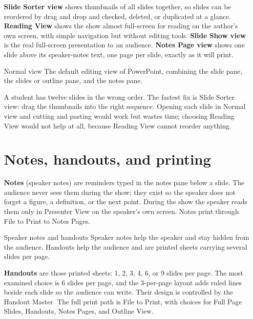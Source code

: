 \textbf{Slide Sorter view} shows thumbnails of all slides together, so slides
can be reordered by drag and drop and checked, deleted, or duplicated at a
glance. \textbf{Reading View} shows the show almost full-screen for reading on
the author's own screen, with simple navigation but without editing tools.
\textbf{Slide Show view} is the real full-screen presentation to an audience.
\textbf{Notes Page view} shows one slide above its speaker-notes text, one
page per slide, exactly as it will print.

\begin{definitionbox}{Normal view}
The default editing view of PowerPoint, combining the slide pane, the
slides or outline pane, and the notes pane.
\end{definitionbox}

\begin{example}
A student has twelve slides in the wrong order. The fastest fix is Slide
Sorter view: drag the thumbnails into the right sequence. Opening each slide
in Normal view and cutting and pasting would work but wastes time; choosing
Reading View would not help at all, because Reading View cannot reorder
anything.
\end{example}

\section{Notes, handouts, and printing}
\textbf{Notes} (speaker notes) are reminders typed in the notes pane below a
slide. The audience never sees them during the show; they exist so the speaker
does not forget a figure, a definition, or the next point. During the show the
speaker reads them only in Presenter View on the speaker's own screen. Notes
print through File to Print to Notes Pages.

\begin{definitionbox}{Speaker notes and handouts}
Speaker notes help the speaker and stay hidden from the audience. Handouts
help the audience and are printed sheets carrying several slides per page.
\end{definitionbox}

\textbf{Handouts} are those printed sheets: 1, 2, 3, 4, 6, or 9 slides per
page. The most examined choice is 6 slides per page, and the 3-per-page layout
adds ruled lines beside each slide so the audience can write. Their design is
controlled by the Handout Master. The full print path is File to Print, with
choices for Full Page Slides, Handouts, Notes Pages, and Outline View.

